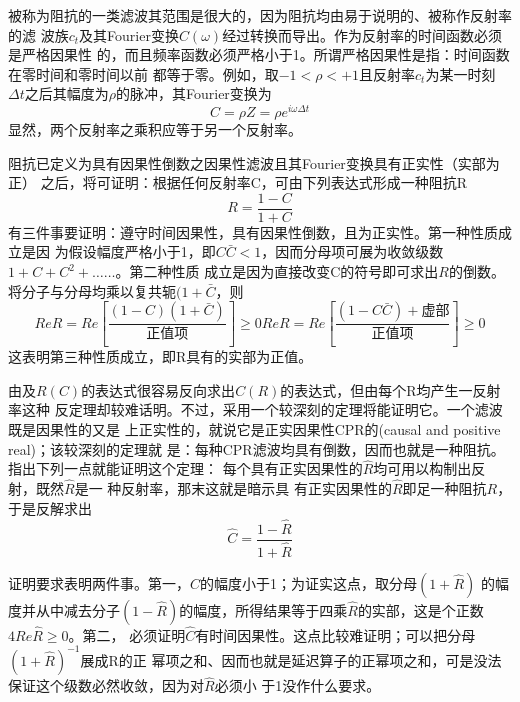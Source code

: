 被称为阻抗的一类滤波其范围是很大的，因为阻抗均由易于说明的、被称作反射率的滤
波族$c_t$及其Fourier变换$C(\omega)$经过转换而导出。作为反射率的时间函数必须是严格因果性
的，而且频率函数必须严格小于1。所谓严格因果性是指：时间函数在零时间和零时间以前
都等于零。例如，取$-1<\rho<+1$且反射率$c_t$为某一时刻$\Delta t$之后其幅度为$\rho$的脉冲，其Fourier变换为
\begin{equation}
C=\rho Z=\rho e^{i\omega\Delta t}
\label{eq:ex4.6.18}
\end{equation}
显然，两个反射率之乘积应等于另一个反射率。

阻抗已定义为具有因果性倒数之因果性滤波且其Fourier变换具有正实性（实部为正）
之后，将可证明：根据任何反射率C，可由下列表达式形成一种阻抗R
\begin{equation}
R=\frac{1-C}{1+C}
\label{eq:ex4.6.19}
\end{equation}
有三件事要证明：遵守时间因果性，具有因果性倒数，且为正实性。第一种性质成立是因
为假设幅度严格小于1，即$C\bar{C}<1$，因而分母项可展为收敛级数$1 + C +
C^2+\ldots\ldots$。第二种性质
成立是因为直接改变C的符号即可求出$R$的倒数。将分子与分母均乘以复共轭$(1+\bar{C}$，则
\begin{subequations}
\begin{equation}
ReR=Re[\frac{(1-C)(1+\bar{C})}{\text{正值项}}]\geq 0
\label{eq:ex4.6.20a}
\end{equation}
\begin{equation}
ReR=Re[\frac{(1-C\bar{C})+\text{虚部}}{\text{正值项}}]\geq 0
\label{eq:ex4.6.20b}
\end{equation}
\end{subequations}
这表明第三种性质成立，即R具有的实部为正值。

由及$R(C)$的表达式很容易反向求出$C(R)$的表达式，但由每个R均产生一反射率这种
反定理却较难话明。不过，采用一个较深刻的定理将能证明它。一个滤波既是因果性的又是
上正实性的，就说它是正实因果性CPR的(causal and positive real)；该较深刻的定理就
是：每种CPR滤波均具有倒数，因而也就是一种阻抗。指出下列一点就能证明这个定理：
每个具有正实因果性的$\hat{R}$均可用以构制出反射，既然$\hat{R}$是一
种反射率，那末这就是暗示具
有正实因果性的$\hat{R}$即足一种阻抗$R$，于是反解求出
\begin{equation}
\hat{C}=\frac{1-\hat{R}}{1+\hat{R}}
\label{eq:ex4.6.21}
\end{equation}

证明要求表明两件事。第一，$\hat{C}$的幅度小于1；为证实这点，取分母$(1+\hat{R})$
的幅度并从中减去分子$(1-\hat{R})$的幅度，所得结果等于四乘$\hat{R}$的实部，这是个正数
$4Re\hat{R}\geq 0$。第二，
必须证明$\hat{C}$有时间因果性。这点比较难证明；可以把分母$(1+\hat{R})^{-1}$展成R的正
幂项之和、因而也就是延迟算子的正幂项之和，可是没法保证这个级数必然收敛，因为对$\hat{R}$必须小
于1没作什么要求。

